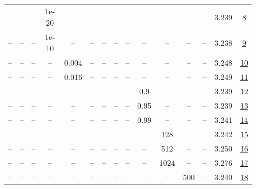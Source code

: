 \begin{table}[H]
\begin{tabular}{ccccccccccccccc}
-- & -- & -- & 1e-20 & -- & -- & -- & -- & -- & -- & -- & -- & -- & 3.239 & \href{https://wandb.ai/stanford-mercury/optimizer-scaling/runs/sweep-130m-21B-soape90bb59lr0.008-wd0.1-minlr0-warmup1000-b10.95-8dbf93}{8} \\
-- & -- & -- & 1e-10 & -- & -- & -- & -- & -- & -- & -- & -- & -- & 3.238 & \href{https://wandb.ai/stanford-mercury/optimizer-scaling/runs/sweep-130m-21B-soape764fd7lr0.008-wd0.1-minlr0-warmup1000-b10.95-e02893}{9} \\
-- & -- & -- & -- & 0.004 & -- & -- & -- & -- & -- & -- & -- & -- & 3.248 & \href{https://wandb.ai/stanford-mercury/optimizer-scaling/runs/sweep-130m-21B-soapea6eb5clr0.004-wd0.1-minlr0-warmup1000-b10.95-8a2995}{10} \\
-- & -- & -- & -- & 0.016 & -- & -- & -- & -- & -- & -- & -- & -- & 3.249 & \href{https://wandb.ai/stanford-mercury/optimizer-scaling/runs/sweep-130m-21B-soapeb1fde6lr0.016-wd0.1-minlr0-warmup1000-b10.95-5f7cea}{11} \\
-- & -- & -- & -- & -- & -- & -- & -- & -- & 0.9 & -- & -- & -- & 3.239 & \href{https://wandb.ai/stanford-mercury/optimizer-scaling/runs/sweep-130m-21B-soape79ae56lr0.008-wd0.1-minlr0-warmup1000-b10.95-0877bc}{12} \\
-- & -- & -- & -- & -- & -- & -- & -- & -- & 0.95 & -- & -- & -- & 3.239 & \href{https://wandb.ai/stanford-mercury/optimizer-scaling/runs/sweep-130m-21B-soape3988b4lr0.008-wd0.1-minlr0-warmup1000-b10.95-e19da4}{13} \\
-- & -- & -- & -- & -- & -- & -- & -- & -- & 0.99 & -- & -- & -- & 3.241 & \href{https://wandb.ai/stanford-mercury/optimizer-scaling/runs/sweep-130m-21B-soape71bf2dlr0.008-wd0.1-minlr0-warmup1000-b10.95-76d2e8}{14} \\
-- & -- & -- & -- & -- & -- & -- & -- & -- & -- & 128 & -- & -- & 3.242 & \href{https://wandb.ai/stanford-mercury/optimizer-scaling/runs/sweep-130m-21B-soape621149lr0.008-wd0.1-minlr0-warmup1000-b10.95-3bf74a}{15} \\
-- & -- & -- & -- & -- & -- & -- & -- & -- & -- & 512 & -- & -- & 3.250 & \href{https://wandb.ai/stanford-mercury/optimizer-scaling/runs/sweep-130m-21B-soape63e5b5lr0.008-wd0.1-minlr0-warmup1000-b10.95-1d80c0}{16} \\
-- & -- & -- & -- & -- & -- & -- & -- & -- & -- & 1024 & -- & -- & 3.276 & \href{https://wandb.ai/stanford-mercury/optimizer-scaling/runs/sweep-130m-21B-soape55a246lr0.008-wd0.1-minlr0-warmup1000-b10.95-73d7b2}{17} \\
-- & -- & -- & -- & -- & -- & -- & -- & -- & -- & -- & 500 & -- & 3.240 & \href{https://wandb.ai/stanford-mercury/optimizer-scaling/runs/sweep-130m-21B-soape5e3c26lr0.008-wd0.1-minlr0-warmup500-b10.95--603435}{18} \\

\end{tabular}
\end{table}
